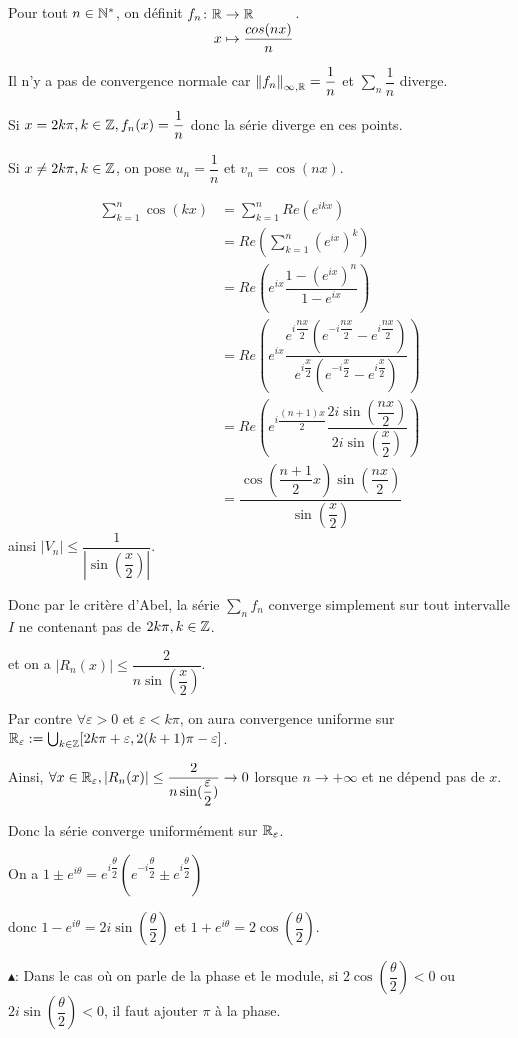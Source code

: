 \documentclass[a4paper,12pt]{article}
\begin{document}
\begin{exemple}
    Pour tout $n \in \mathbb{N}^*$, on définit $\funcdef{f_n}{\R}{\R}{x}{\dfrac{cos(nx)}{n}}$.

    Il n'y a pas de convergence normale car $\left\lVert f_n\right\rVert_{\infty, \mathbb{R}} = \dfrac{1}{n}$ et $\sum\limits_n \dfrac{1}{n}$ diverge.

    Si $x = 2k\pi, k \in \mathbb{Z}, f_n(x) = \dfrac{1}{n}$ donc la série diverge en ces points.

    Si $x \neq 2k\pi, k \in \mathbb{Z}$, on pose $u_n = \dfrac{1}{n}$ et $v_n = \cos(nx)$.

    \begin{align*}
        \sum_{k=1}^n \cos(kx) &= \sum_{k=1}^n Re(e^{ikx}) \\
        &= Re\left( \sum_{k=1}^n (e^{ix})^k \right) \\
        &= Re\left( e^{ix} \dfrac{1 - (e^{ix})^n}{1 - e^{ix}} \right) \\
        &= Re\left( e^{ix} \dfrac{e^{i\dfrac{nx}{2}}\left( e^{-i\dfrac{nx}{2}} - e^{i\dfrac{nx}{2}} \right)}{e^{i\dfrac{x}{2}} \left( e^{-i\dfrac{x}{2}} - e^{i\dfrac{x}{2}} \right)} \right) \\
        &= Re\left( e^{i\dfrac{(n+1)x}{2}} \dfrac{2i \sin(\dfrac{nx}{2})}{2i \sin(\dfrac{x}{2})} \right) \\
        &= \dfrac{\cos(\dfrac{n+1}{2}x) \sin(\dfrac{nx}{2})}{\sin(\dfrac{x}{2})}
    \end{align*}
    ainsi $ \left| V_n \right| \leq \dfrac{1}{\left| \sin(\dfrac{x}{2}) \right|}$.

    Donc par le critère d'Abel, la série $\sum\limits_n f_n$ converge simplement sur tout intervalle $I$ ne contenant pas de $2k\pi, k \in \mathbb{Z}$.

    et on a $|R_n(x)| \leq \dfrac{2}{n \sin(\dfrac{x}{2})}$.

    Par contre $\forall \varepsilon > 0$ et $\varepsilon < k \pi$, on aura convergence uniforme sur $\mathbb{R}_\varepsilon := \bigcup_{k \in \mathbb{Z}}[2k\pi + \varepsilon, 2(k+1)\pi - \varepsilon]$.

    Ainsi, $\forall x \in \mathbb{R}_\varepsilon, |R_n(x)| \leq \dfrac{2}{n \sin(\dfrac{\varepsilon}{2})} \to 0$ lorsque $n \to +\infty$ et ne dépend pas de $x$.

    Donc la série converge uniformément sur $\mathbb{R}_\varepsilon$.
\end{exemple}

\begin{methode}
    On a $1 \pm e^{i\theta} = e^{i\dfrac{\theta}{2}} \left( e^{-i\dfrac{\theta}{2}} \pm e^{i\dfrac{\theta}{2}} \right)$

    donc $1 - e^{i\theta} = 2i \sin(\dfrac{\theta}{2})$ et $1 + e^{i\theta} = 2\cos(\dfrac{\theta}{2})$.

    $\blacktriangle$: Dans le cas où on parle de la phase et le module, si $2\cos(\dfrac{\theta}{2}) < 0$ ou $2i\sin(\dfrac{\theta}{2}) < 0$, il faut ajouter $\pi$ à la phase.
\end{methode}
\end{document}
